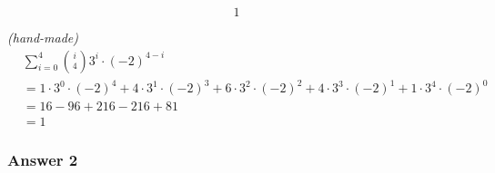 \documentclass[11pt]{article}
\begin{document}
$$1$$

\emph{(hand-made)}
\begin{align*}
  &\sum_{i = 0}^4 {i\choose 4} 3^i \cdot (-2)^{4 - i} \\
  &= 1 \cdot 3^0 \cdot (-2)^4 + 4 \cdot 3^1 \cdot (-2)^3 +
  6 \cdot 3^2 \cdot (-2)^2 + 4 \cdot 3^3 \cdot (-2)^1 +
  1 \cdot 3^4 \cdot (-2)^0 \\
  &= 16 - 96 + 216 - 216 + 81 \\
  &= 1
\end{align*}
\subsubsection{Answer 2}
\label{sec-1-1-2}
\end{document}

